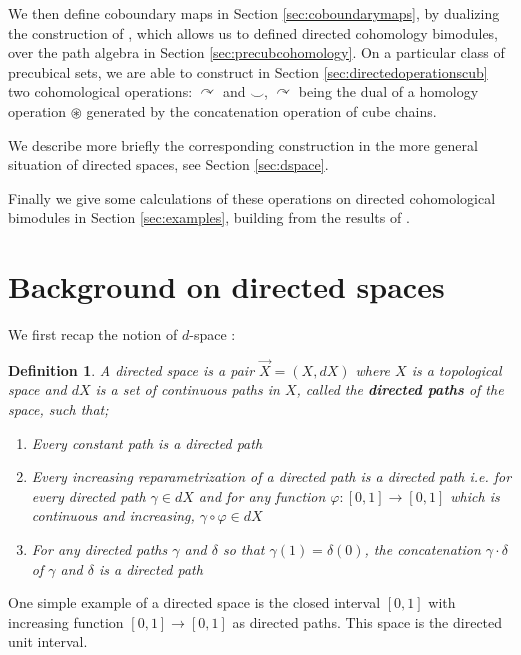 \documentclass{article}
\newtheorem{definition}{Definition}[section]
\begin{document}
We then define coboundary maps in 
Section \ref{sec:coboundarymaps}, by dualizing the construction of \cite{directedpersistencemodule}, which allows us to defined directed cohomology bimodules, over the path algebra in 
Section \ref{sec:precubcohomology}. On a particular class of precubical sets, we are able to construct in Section \ref{sec:directedoperationscub}
two cohomological operations: $\curvearrowright$ and $\smile$, $\curvearrowright$ being the dual of a homology operation $\circledast$ generated by the concatenation operation of cube chains. 

We describe more briefly the corresponding construction in the more general situation of directed spaces, see 
Section \ref{sec:dspace}. 

Finally we give some calculations of these operations on directed cohomological bimodules in 
Section \ref{sec:examples}, building from the results of \cite{Barychnikov}.


\section{Background on directed spaces}

\label{sec:backgrounddspace}
 We first recap the notion of $d$-space \cite{thebook,grandisbook}: %

\begin{definition}
A {directed space} is a pair $\Vec{X} = (X, dX)$ where $X$ is a topological space and $dX$ is a set of continuous paths in $X$, called the \textbf{directed paths} %
of the space, such that;
\begin{enumerate}
    \item[(i)] Every constant path is a directed path
    \item[(ii)] Every increasing reparametrization of a directed path is a directed path i.e. for every directed path $\gamma \in dX$ and for any function $\varphi : [0,1] \to [0,1]$ which is continuous and increasing, $\gamma \circ \varphi \in dX$  
    \item[(iii)] For any directed paths $\gamma$ and $\delta$ so that $\gamma(1) = \delta(0)$, the concatenation $\gamma \cdot \delta$ of $\gamma$ and $\delta$ is a directed path
\end{enumerate}
\end{definition}

One simple example of a directed space is the closed interval $[0,1]$ with increasing function $[0,1] \to [0,1]$ as directed paths. This space is the {directed unit interval}.
\end{document}
